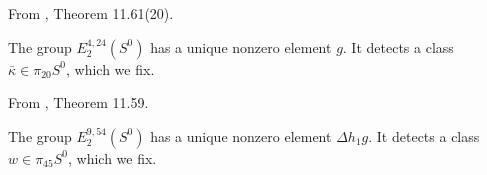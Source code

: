 \begin{proposition}
\label{sem:Literature:kappa-detection}
From \cite{BR21}, Theorem 11.61(20).\par

The group $E_2^{4,24}(S^0)$ has a unique nonzero element $g$. It detects a class $\bar\kappa\in\pi_{20}S^0$, which we fix.

From \cite{BR21}, Theorem 11.59.\par

The group $E_2^{9,54}(S^0)$ has a unique nonzero element $\Delta h_1g$. It detects a class $w\in\pi_{45}S^0$, which we fix.

\end{proposition}
